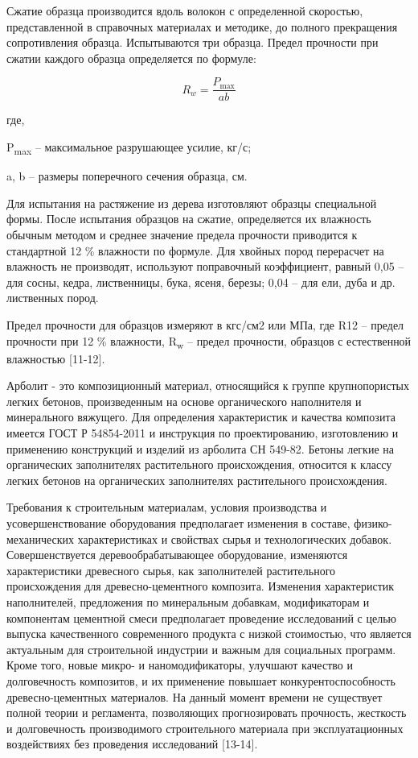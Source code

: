 \begin{multicols}{2}
Сжатие образца производится вдоль волокон с определенной скоростью,
представленной в справочных материалах и методике, до полного
прекращения сопротивления образца. Испытываются три образца. Предел
прочности при сжатии каждого образца определяется по формуле:

\begin{equation}
R_{w} = \frac{P_{\max}}{ab}
\end{equation}

где,

P\textsubscript{max} -- максимальное разрушающее усилие, кг/с;

a, b -- размеры поперечного сечения образца, см.

Для испытания на растяжение из дерева изготовляют образцы специальной
формы. После испытания образцов на сжатие, определяется их влажность
обычным методом и среднее значение предела прочности приводится к
стандартной 12 \% влажности по формуле. Для хвойных пород перерасчет на
влажность не производят, используют поправочный коэффициент, равный 0,05
-- для сосны, кедра, лиственницы, бука, ясеня, березы; 0,04 -- для ели,
дуба и др. лиственных пород.

Предел прочности для образцов измеряют в кгс/см2 или МПа, где R12 --
предел прочности при 12 \% влажности, R\textsubscript{w} -- предел
прочности, образцов с естественной влажностью {[}11-12{]}.

Арболит - это композиционный материал, относящийся к группе
крупнопористых легких бетонов, произведенным на основе органического
наполнителя и минерального вяжущего. Для определения характеристик и
качества композита имеется ГОСТ Р 54854-2011 и инструкция по
проектированию, изготовлению и применению конструкций и изделий из
арболита СН 549-82. Бетоны легкие на органических заполнителях
растительного происхождения, относится к классу легких бетонов на
органических заполнителях растительного происхождения.

Требования к строительным материалам, условия производства и
усовершенствование оборудования предполагает изменения в составе,
физико-механических характеристиках и свойствах сырья и технологических
добавок. Совершенствуется деревообрабатывающее оборудование, изменяются
характеристики древесного сырья, как заполнителей растительного
происхождения для древесно-цементного композита. Изменения характеристик
наполнителей, предложения по минеральным добавкам, модификаторам и
компонентам цементной смеси предполагает проведение исследований с целью
выпуска качественного современного продукта с низкой стоимостью, что
является актуальным для строительной индустрии и важным для социальных
программ. Кроме того, новые микро- и наномодификаторы, улучшают качество
и долговечность композитов, и их применение повышает
конкурентоспособность древесно-цементных материалов. На данный момент
времени не существует полной теории и регламента, позволяющих
прогнозировать прочность, жесткость и долговечность производимого
строительного материала при эксплуатационных воздействиях без проведения
исследований {[}13-14{]}.


\end{multicols}

